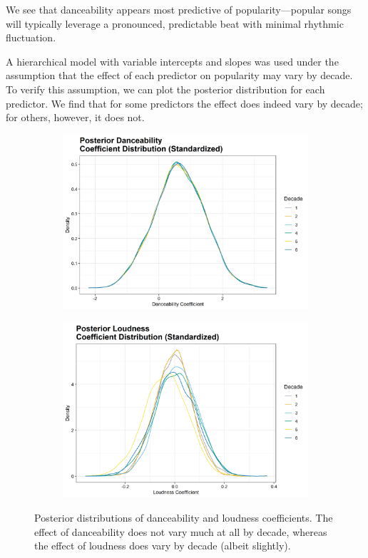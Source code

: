 \documentclass[12pt, twoside]{article}
\begin{document}
We see that danceability appears most predictive of popularity---popular songs will typically leverage a pronounced, predictable beat with minimal rhythmic fluctuation. 

A hierarchical model with variable intercepts and slopes was used under the assumption that the effect of each predictor on popularity may vary by decade. To verify this assumption, we can plot the posterior distribution for each predictor. We find that for some predictors the effect does indeed vary by decade; for others, however, it does not.

\begin{figure}[H]
\begin{subfigure}[b]{0.5\textwidth}
\centering
\includegraphics[width = \textwidth]{danceabiltiy_dist.png}
\caption{}
\label{fig:prior}
\end{subfigure}
\begin{subfigure}[b]{0.5\textwidth}
\centering
\includegraphics[width = \textwidth]{loudness_dist.png}
\caption{}
\label{fig:post}
\end{subfigure}
\caption{Posterior distributions of danceability and loudness coefficients. The effect of danceability does not vary much at all by decade, whereas the effect of loudness does vary by decade (albeit slightly). }
\end{figure}
\end{document}
